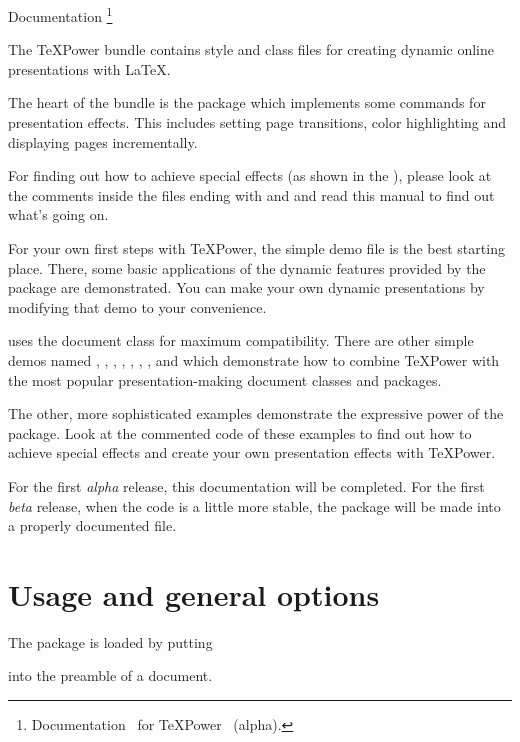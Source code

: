 \begin{slide}
\makeslidetitle
{%
  Documentation%
  \thanks{Documentation \docversion\ for \TeX Power \tpversion\ (alpha).}%
  }%

The \TeX Power bundle contains style and class files for creating dynamic online presentations with \LaTeX.

The heart of the bundle is the package  which implements some commands for presentation effects. This
includes setting page transitions, color highlighting and displaying pages incrementally.

For finding out how to achieve special effects (as shown in the ),
please look at the comments inside the files ending with  and 
and read this manual to find out what's going on.

\newslide

For your own first steps with \TeX Power, the simple demo file  is the best starting
place. There, some basic applications of the dynamic features provided by the  package are
demonstrated. You can make your own dynamic presentations by modifying that demo to your convenience.

 uses the  document class for maximum
compatibility. There are other simple demos named
, , ,
, , ,
, and 
which demonstrate how to combine \TeX Power with the
most popular presentation-making document classes and packages.

\newslide

The other, more sophisticated examples demonstrate the expressive power of the
 package. Look at the commented code of these examples to find out how to achieve special effects and
create your own presentation effects with \TeX Power.

For the first \emph{alpha} release, this documentation will be completed. For the first \emph{beta} release, when the
code is a little more stable, the  package will be made into a properly documented  file.

\newslide

%
\section{Usage and general options}
The  package is loaded by putting
\begin{center}
\end{center}
into the preamble of a document.


\end{slide}
